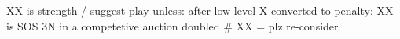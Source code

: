 XX is strength / suggest play unless:
after low-level X converted to penalty: XX is SOS
3N in a competetive auction doubled  # XX = plz re-consider
